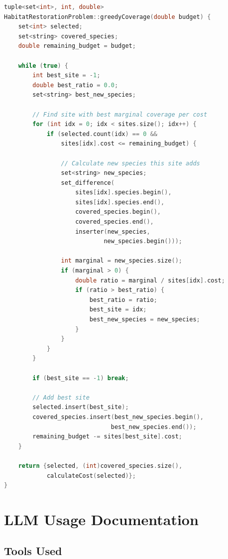 \documentclass[sigconf,nonacm]{acmart}
\begin{document}
\begin{lstlisting}[language=C++, caption=Greedy Maximum Coverage]
tuple<set<int>, int, double>
HabitatRestorationProblem::greedyCoverage(double budget) {
    set<int> selected;
    set<string> covered_species;
    double remaining_budget = budget;

    while (true) {
        int best_site = -1;
        double best_ratio = 0.0;
        set<string> best_new_species;

        // Find site with best marginal coverage per cost
        for (int idx = 0; idx < sites.size(); idx++) {
            if (selected.count(idx) == 0 &&
                sites[idx].cost <= remaining_budget) {

                // Calculate new species this site adds
                set<string> new_species;
                set_difference(
                    sites[idx].species.begin(),
                    sites[idx].species.end(),
                    covered_species.begin(),
                    covered_species.end(),
                    inserter(new_species,
                            new_species.begin()));

                int marginal = new_species.size();
                if (marginal > 0) {
                    double ratio = marginal / sites[idx].cost;
                    if (ratio > best_ratio) {
                        best_ratio = ratio;
                        best_site = idx;
                        best_new_species = new_species;
                    }
                }
            }
        }

        if (best_site == -1) break;

        // Add best site
        selected.insert(best_site);
        covered_species.insert(best_new_species.begin(),
                              best_new_species.end());
        remaining_budget -= sites[best_site].cost;
    }

    return {selected, (int)covered_species.size(),
            calculateCost(selected)};
}
\end{lstlisting}

\section{LLM Usage Documentation}

\subsection{Tools Used}
\end{document}
